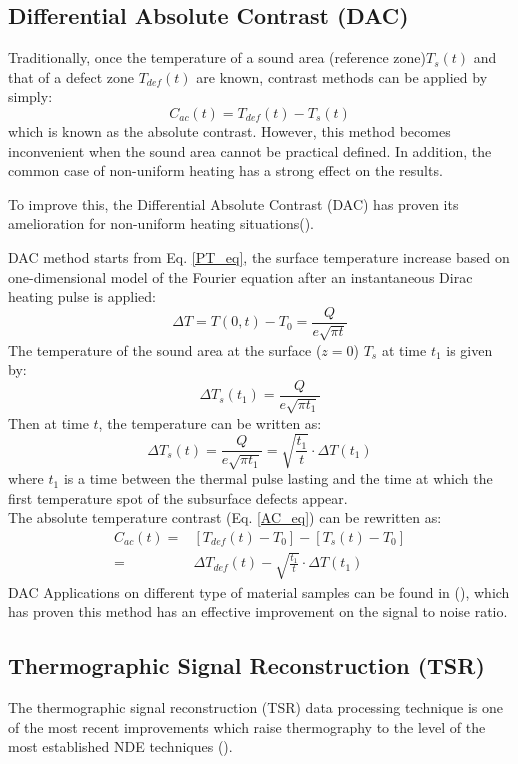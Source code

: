 \subsection{Differential Absolute Contrast (DAC)}
Traditionally, once the temperature of a sound area (reference zone)$T_s(t) $ and that of a defect zone $T_{def}(t) $ are known, contrast methods can be applied by simply:
\begin{equation}
C_{ac}(t) = T_{def}(t) - T_s(t)
\label{AC_eq}
\end{equation}
which is known as the absolute contrast. However, this method becomes inconvenient when the sound area cannot be practical defined. In addition, the common case of non-uniform heating has a strong effect on the results.

To improve this, the Differential Absolute Contrast (DAC) has proven its amelioration for non-uniform heating situations(\citet{Benitez2008, pilla2002new}).

DAC method starts from Eq. \ref{PT_eq}, the surface temperature increase based on one-dimensional model of the Fourier equation after an instantaneous Dirac heating pulse is applied:
\begin{equation}
\Delta T = T(0,t) - T_0  = \frac{Q}{e\sqrt{\pi t}}
\label{PT_eq_2}
\end{equation}
The temperature of the sound area at the surface ($z=0$) $T_s$ at time $t_1$ is given by:
\begin{equation}
\Delta T_s(t_1) = \frac{Q}{e\sqrt{\pi t_1}}
\end{equation}
Then at time $t$, the temperature can be written as:
\begin{equation}
\Delta T_s(t) = \frac{Q}{e\sqrt{\pi t_1}} = \sqrt{\frac{t_1}{t}}\cdot \Delta T(t_1)
\end{equation}
where $t_1$ is a time between the thermal pulse lasting and the time at which the first temperature spot of the subsurface defects appear.\\
The absolute temperature contrast (Eq. \ref{AC_eq}) can be rewritten as:
\begin{align}
C_{ac}(t) = & [T_{def}(t) -T_0] - [T_s(t) - T_0] \\ 
= & \Delta T_{def}(t) - \sqrt{\frac{t_1}{t}}\cdot \Delta T(t_1)
\end{align}
DAC Applications on different type of material samples can be found in (\citet{pilla2002new}), which has proven this method has an effective improvement on the signal to noise ratio.

\subsection{Thermographic Signal Reconstruction (TSR)}
The thermographic signal reconstruction (TSR) data processing technique is one of the most recent improvements which raise thermography to the level of the most established NDE techniques (\citet{shepard2003reconstruction, Balageas2015}).

